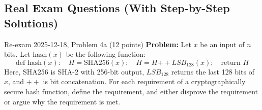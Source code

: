 \documentclass[12pt, a4paper]{article}
\begin{document}
\subsection*{Real Exam Questions (With Step-by-Step Solutions)}

\begin{practicebox}{Re-exam 2025-12-18, Problem 4a (12 points)}
\textbf{Problem:} Let $x$ be an input of $n$ bits. Let $\mathrm{hash}(x)$ be the following function:
\[ \text{def } \mathrm{hash}(x):\quad H = \mathrm{SHA256}(x);\quad H = H \mathbin{++} LSB_{128}(x);\quad \text{return } H \]
Here, SHA256 is SHA-2 with 256-bit output, $LSB_{128}$ returns the last 128 bits of $x$, and $\mathbin{++}$ is bit concatenation. For each requirement of a cryptographically secure hash function, define the requirement, and either disprove the requirement or argue why the requirement is met.


\end{practicebox}
\end{document}
